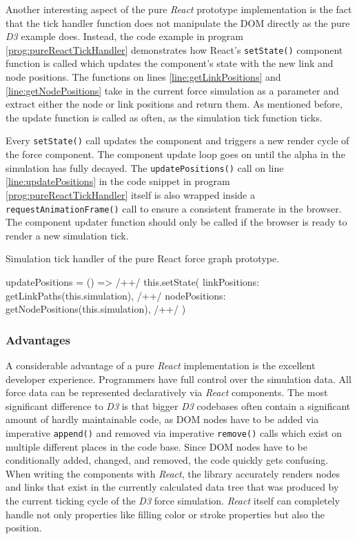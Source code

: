 Another interesting aspect of the pure \emph{React} prototype implementation is the fact that the tick handler function does not manipulate the DOM directly as the pure \emph{D3} example does. Instead, the code example in program \ref{prog:pureReactTickHandler} demonstrates how React's \texttt{setState()} component function is called which updates the component's state with the new link and node positions. The functions on lines \ref{line:getLinkPositions} and \ref{line:getNodePositions} take in the current force simulation as a parameter and extract either the node or link positions and return them. As mentioned before, the update function is called as often, as the simulation tick function ticks. 

Every \texttt{setState()} call updates the component and triggers a new render cycle of the force component. The component update loop goes on until the alpha in the simulation has fully decayed. The \texttt{updatePositions()} call on line \ref{line:updatePositions} in the code snippet in program \ref{prog:pureReactTickHandler} itself is also wrapped inside a \texttt{requestAnimationFrame()} call to ensure a consistent framerate in the browser. The component updater function should only be called if the browser is ready to render a new simulation tick.

\begin{program}
\caption{Simulation tick handler of the pure React force graph prototype.}
\label{prog:pureReactTickHandler}
\begin{JsCode}
updatePositions = () => { /+\label{line:updatePositions}+/
  this.setState({
    linkPositions: getLinkPaths(this.simulation), /+\label{line:getLinkPositions}+/
    nodePositions: getNodePositions(this.simulation), /+\label{line:getNodePositions}+/
  })
}
\end{JsCode}
\end{program}

\subsubsection{Advantages}


A considerable advantage of a pure \emph{React} implementation is the excellent developer experience. Programmers have full control over the simulation data. All force data can be represented declaratively via \emph{React} components. The most significant difference to \emph{D3} is that bigger \emph{D3} codebases often contain a significant amount of hardly maintainable code, as DOM nodes have to be added via imperative \texttt{append()} and removed via imperative \texttt{remove()} calls which exist on multiple different places in the code base. Since DOM nodes have to be conditionally added, changed, and removed, the code quickly gets confusing. When writing the components with \emph{React}, the library accurately renders nodes and links that exist in the currently calculated data tree that was produced by the current ticking cycle of the \emph{D3} force simulation. \emph{React} itself can completely handle not only properties like filling color or stroke properties but also the position.

